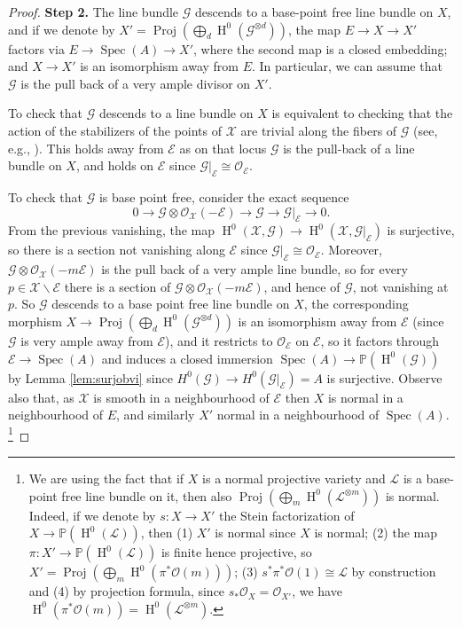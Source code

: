 \documentclass{amsart}
\newcommand{\bP}{\mathbb{P}}
\newcommand{\oH}{\operatorname{H}}
\newcommand{\cE}{\mathcal{E}}
\newcommand{\cG}{\mathcal{G}}
\newcommand{\cL}{\mathcal{L}}
\newcommand{\cO}{\mathcal{O}}
\newcommand{\cX}{\mathcal{X}}
\newcommand{\spec}{\operatorname{Spec}}
\theoremstyle{definition}
\begin{document}
\begin{proof}
\textbf{Step 2.} The line bundle $\cG$ descends to a base-point free line bundle on $X$, and if we denote by $X'=\operatorname{Proj}(\bigoplus_d \oH^0(\cG^{\otimes d}))$, the map $E\to X \to X'$ factors via $E\to \spec(A)\to X'$, where the second map is a closed embedding;
and $X\to X'$ is an isomorphism away from $E$. In particular, we can assume that $\cG$ is the pull back of a very ample divisor on $X'$.
 

To check that $\cG$ descends to a line bundle on $X$ is equivalent to checking that the action of the stabilizers of the points of $\cX$ are trivial along the fibers of $\cG$ (see, e.g., \cite[Thm. 10.3]{Alp}). This holds away from $\cE$ as on that locus $\cG$ is the pull-back of a line bundle on $X$, and holds on $\cE$ since $\cG|_\cE\cong \cO_{\cE}$.

To check that $\cG$ is base point free, consider the exact sequence 
$$0\to \cG\otimes \cO_{\cX}(-\cE)\to \cG \to \cG|_{\cE}\to 0.$$
From the previous vanishing, the map $\oH^0(\cX,\cG)\to \oH^0(\cX,\cG|_{\cE})$ is surjective, so there is a section not vanishing along $\cE$ since $\cG|_\cE\cong \cO_\cE$. Moreover, $\cG\otimes \cO_{\cX}(-m\cE)$ is the pull back of a very ample line bundle, so for every $p\in \cX\smallsetminus \cE$ there is a section of $\cG\otimes \cO_{\cX}(-m\cE)$, and hence of $\cG$,
not vanishing at $p$. So $\cG$ descends to a base point free line bundle on $X$, the corresponding morphism $X\to \operatorname{Proj}(\bigoplus_d\oH^0(\cG^{\otimes d}))$ is an isomorphism away from $\cE$ (since $\cG$ is very ample away from $\cE$), and it restricts to $\cO_{\cE}$ on $\cE$, so it factors through $\cE\to \spec(A)$ and induces a closed immersion $\spec(A)\to \bP(\oH^0(\cG))$ by Lemma \ref{lem:surjobvi} since $H^0(\cG) \to H^0(\cG|_{\cE})=A$ is surjective. 
Observe also that, as $\cX$ is smooth in a neighbourhood of $\cE$ then $X$ is normal in a neighbourhood of $E$, and similarly $X'$  normal in a neighbourhood of $\spec(A)$. \footnote{We are using the fact that if $X$ is a normal projective variety and $\cL$ is a base-point free line bundle on it, then also $\operatorname{Proj}\left(\bigoplus_m \oH^0(\cL^{\otimes m})\right)$ is normal. Indeed, if we denote by $s:X\to X'$ the Stein factorization of $X\to \bP(\oH^0(\cL))$, then (1) $X'$ is normal since $X$ is normal; (2) the map $\pi:X'\to \bP(\oH^0(\cL))$ is finite hence projective, so $X'=\operatorname{Proj}\left(\bigoplus_m \oH^0(\pi^*\cO(m))\right)$; (3) $s^*\pi^*\cO(1)\cong \cL$ by construction and (4) by projection formula, since $s_*\cO_X=\cO_{X'}$, we have $\oH^0(\pi^*\cO(m))=\oH^0(\cL^{\otimes m})$. }


\end{proof}
\end{document}
